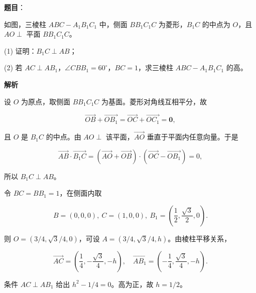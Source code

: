 \begin{answer}

\textbf{题目}：

如图，三棱柱 $ABC-A_1B_1C_1$ 中，侧面 $BB_1C_1C$ 为菱形，$B_1C$ 的中点为 $O$，且 $AO\perp$ 平面 $BB_1C_1C$。
\nopagebreak[4]
\begin{center}\end{center}
\nopagebreak[4]
(1) 证明：$B_1C\perp AB$；

(2) 若 $AC\perp AB_1$，$\angle CBB_1=60^\circ$，$BC=1$，求三棱柱 $ABC-A_1B_1C_1$ 的高。

\textbf{解析}


设 $O$ 为原点，取侧面 $BB_1C_1C$ 为基面。菱形对角线互相平分，故

\nopagebreak[4]
\[
\overrightarrow{OB}+\overrightarrow{OB_1}=\overrightarrow{OC}+\overrightarrow{OC_1}=\boldsymbol0,
\]

且 $O$ 是 $B_1C$ 的中点。由 $AO\perp$ 该平面，$\overrightarrow{AO}$ 垂直于平面内任意向量。于是

\nopagebreak[4]
\[
\overrightarrow{AB}\cdot\overrightarrow{B_1C}
=\left(\overrightarrow{AO}+\overrightarrow{OB}\right)\cdot
\left(\overrightarrow{OC}-\overrightarrow{OB_1}\right)=0,
\]

所以 $B_1C\perp AB$。


令 $BC=BB_1=1$，在侧面内取

\nopagebreak[4]
\[
B=(0,0,0),\ C=(1,0,0),\ B_1=\left(\frac12,\frac{\sqrt3}{2},0\right).
\]

则 $O=(3/4,\sqrt3/4,0)$，可设 $A=(3/4,\sqrt3/4,h)$。由棱柱平移关系，

\nopagebreak[4]
\[
\overrightarrow{AC}=\left(\frac14,-\frac{\sqrt3}{4},-h\right),\quad
\overrightarrow{AB_1}=\left(-\frac14,\frac{\sqrt3}{4},-h\right).
\]

条件 $AC\perp AB_1$ 给出 $h^2-1/4=0$。高为正，故 $h=1/2$。



\end{answer}
